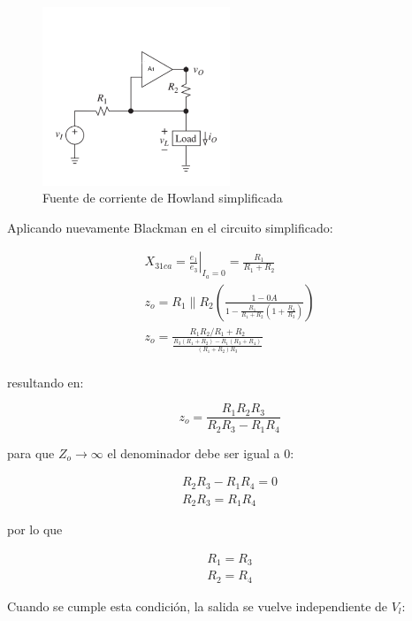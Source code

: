 \begin{figure}[ht]
    \centering
    \includegraphics[width=0.5\textwidth]{src/images/fuente-corriente-howland-simplificado.png}
    \caption{Fuente de corriente de Howland simplificada}
    \label{fig:mt-fuente-corriente-howland-simplificado}    
\end{figure}

Aplicando nuevamente Blackman en el circuito simplificado:

\begin{align*}
    X_{31ca} = \left. \frac{e_1}{e_3} \right|_{I_a=0} = \frac{R_1}{R_1 + R_2} \\
    z_o = R_1 \parallel R_2 (\frac{1 - 0A}{1 - \frac{R_1}{R_1 + R_2}(1 + \frac{R_4}{R_3})}) \\
    z_o = \frac{R_1 R_2 / R_1 + R_2}{\frac{R_3(R_1 + R_2) - R_1(R_3 + R_4)}{(R_1 + R_2)R_3}} \\
\end{align*}

resultando en:

\begin{equation}
    z_o = \frac{R_1 R_2 R_3}{R_2 R_3 - R_1 R_4}
\end{equation}

para que $Z_o \rightarrow\infty$ el denominador debe ser igual a 0:

\begin{align*}
    R_2 R_3 - R_1 R_4 = 0 \\
    R_2 R_3 = R_1 R_4
\end{align*}

por lo que 

\begin{align}
    \boxed{R_1 = R_3} \\
    \boxed{R_2 = R_4} 
\end{align}

Cuando se cumple esta condición, la salida se vuelve independiente de $V_l$:

